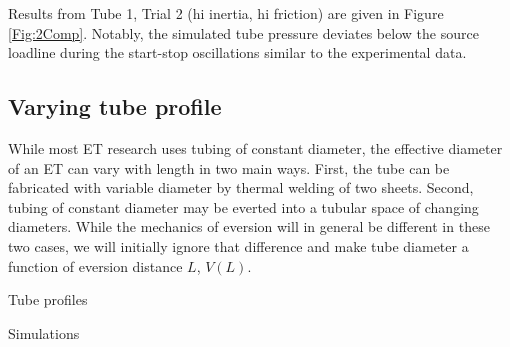 \documentclass[letterpaper]{article}
\begin{document}
Results from Tube 1, Trial 2 (hi inertia, hi friction) are given in Figure \ref{Fig:2Comp}.
Notably, the simulated tube pressure deviates below the source loadline during the start-stop
oscillations similar to the experimental data.




\subsection{Varying tube profile}

While most ET research uses tubing of constant diameter, the effective diameter of an ET can vary with
length in two main ways.   First, the tube can be fabricated with variable diameter by thermal welding of two sheets.
Second, tubing of constant diameter may be everted into a tubular space of changing diameters.
While the mechanics of eversion will in general be different in these two cases, we will initially ignore that difference
and make tube diameter a function of eversion distance $L$, $V(L)$.

Tube profiles

Simulations






\end{document}
